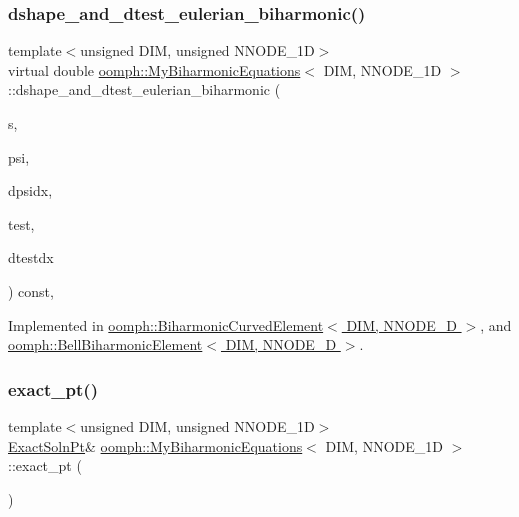 \subsubsection{\texorpdfstring{dshape\+\_\+and\+\_\+dtest\+\_\+eulerian\+\_\+biharmonic()}{dshape\_and\_dtest\_eulerian\_biharmonic()}\hspace{0.1cm}{\footnotesize\ttfamily [2/2]}}
{\footnotesize\ttfamily template$<$unsigned D\+IM, unsigned N\+N\+O\+D\+E\+\_\+1D$>$ \\
virtual double \hyperlink{classoomph_1_1MyBiharmonicEquations}{oomph\+::\+My\+Biharmonic\+Equations}$<$ D\+IM, N\+N\+O\+D\+E\+\_\+1D $>$\+::dshape\+\_\+and\+\_\+dtest\+\_\+eulerian\+\_\+biharmonic (\begin{DoxyParamCaption}\item[{const Vector$<$ double $>$ \&}]{s,  }\item[{Shape \&}]{psi,  }\item[{D\+Shape \&}]{dpsidx,  }\item[{Shape \&}]{test,  }\item[{D\+Shape \&}]{dtestdx }\end{DoxyParamCaption}) const\hspace{0.3cm}{\ttfamily [protected]}, {}}



Implemented in \hyperlink{classoomph_1_1BiharmonicCurvedElement_a3dcacc1730a9bf9bf8f7396a795ce6b6}{oomph\+::\+Biharmonic\+Curved\+Element$<$ D\+I\+M, N\+N\+O\+D\+E\+\_\+D $>$}, and \hyperlink{classoomph_1_1BellBiharmonicElement_aaa8959c7456a75c15db4b42a70812304}{oomph\+::\+Bell\+Biharmonic\+Element$<$ D\+I\+M, N\+N\+O\+D\+E\+\_\+D $>$}.

\mbox{\label{classoomph_1_1MyBiharmonicEquations_a74abbb3a09de067c3c10547b2ccc1ddd}} 
\subsubsection{\texorpdfstring{exact\+\_\+pt()}{exact\_pt()}\hspace{0.1cm}{\footnotesize\ttfamily [1/2]}}
{\footnotesize\ttfamily template$<$unsigned D\+IM, unsigned N\+N\+O\+D\+E\+\_\+1D$>$ \\
\hyperlink{classoomph_1_1MyBiharmonicEquations_a20238fec79ab67b90f3be58ea498e681}{Exact\+Soln\+Pt}\& \hyperlink{classoomph_1_1MyBiharmonicEquations}{oomph\+::\+My\+Biharmonic\+Equations}$<$ D\+IM, N\+N\+O\+D\+E\+\_\+1D $>$\+::exact\+\_\+pt (\begin{DoxyParamCaption}{ }\end{DoxyParamCaption})\hspace{0.3cm}{\ttfamily [inline]}}



